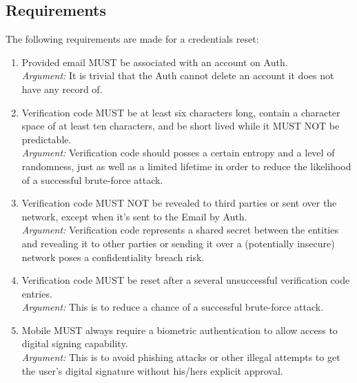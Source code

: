         \subsection{Requirements}
        The following requirements are made for a credentials reset:
        \begin{enumerate}
                \item Provided email MUST be associated with an account on Auth.\\
                \textit{Argument:} It is trivial that the Auth cannot delete an account it does not have any record of. 
    
                \item Verification code MUST be at least six characters long, contain a character space of at least ten 
                      characters, and be short lived while it MUST NOT be predictable.\\        
                \textit{Argument:} Verification code should posses a certain entropy and a level of randomness, 
                                   just as well as a limited lifetime in order to reduce the likelihood of a 
                                   successful brute-force attack.
    
                \item Verification code MUST NOT be revealed to third parties or sent over the network, except when
                      it's sent to the Email by Auth.\\        
                \textit{Argument:} Verification code represents a shared secret between the entities and revealing 
                                   it to other parties or sending it over a (potentially insecure) network poses 
                                   a confidentiality breach risk. 
    
                \item Verification code MUST be reset after a several unsuccessful verification code entries.\\        
                \textit{Argument:} This is to reduce a chance of a successful brute-force attack.
    
                \item Mobile MUST always require a biometric authentication to allow access to digital signing 
                      capability.\\        
                \textit{Argument:} This is to avoid phishing attacks or other illegal attempts to get the user's 
                                   digital signature without his/hers explicit approval.


\end{enumerate}

